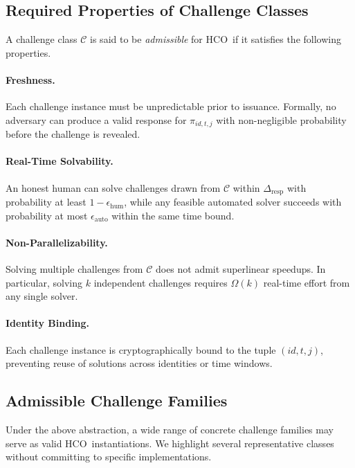 \documentclass[11pt]{article}
\newcommand{\HCO}{HCO\xspace}
\begin{document}
\subsection{Required Properties of Challenge Classes}

A challenge class $\mathcal{C}$ is said to be \emph{admissible} for \HCO\ if it satisfies the following properties.

\paragraph{Freshness.}
Each challenge instance must be unpredictable prior to issuance. Formally, no adversary can produce a valid response for $\pi_{id,t,j}$ with non-negligible probability before the challenge is revealed.

\paragraph{Real-Time Solvability.}
An honest human can solve challenges drawn from $\mathcal{C}$ within $\Delta_{\mathrm{resp}}$ with probability at least $1-\epsilon_{\mathrm{hum}}$, while any feasible automated solver succeeds with probability at most $\epsilon_{\mathrm{auto}}$ within the same time bound.

\paragraph{Non-Parallelizability.}
Solving multiple challenges from $\mathcal{C}$ does not admit superlinear speedups. In particular, solving $k$ independent challenges requires $\Omega(k)$ real-time effort from any single solver.

\paragraph{Identity Binding.}
Each challenge instance is cryptographically bound to the tuple $(id, t, j)$, preventing reuse of solutions across identities or time windows.

\subsection{Admissible Challenge Families}

Under the above abstraction, a wide range of concrete challenge families may serve as valid \HCO\ instantiations. We highlight several representative classes without committing to specific implementations.
\end{document}
